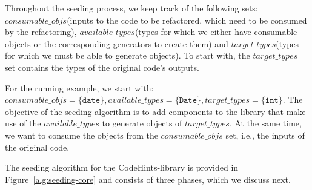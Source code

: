 \documentclass[conference]{IEEEtran}
\newcommand{\consumableobjs}{\mbox{$\mathit{consumable\_objs}$}\xspace}
\newcommand{\availabletypes}{\mbox{$\mathit{available\_types}$}\xspace}
\newcommand{\targettypes}{\mbox{$\mathit{target\_types}$}\xspace}
\begin{document}


Throughout the seeding process, we keep track of the following sets:
\consumableobjs (inputs to the code to be refactored, which need to be consumed by the refactoring),  
\availabletypes (types for which we either have consumable objects or the corresponding generators to create them) and 
\targettypes (types for which we must be able to generate objects). To start with, the \targettypes set
contains the types of the original code's outputs. %

For the running example, we start with:
  $\consumableobjs = \{\texttt{date}\},  
  \availabletypes = \{\texttt{Date}\},
  \targettypes    = \{\texttt{int}\}$.
%
%
%
The objective of the seeding algorithm is to
add components to the library that make use of the \availabletypes to generate objects
of \targettypes. At the same time, we want to consume the objects from the
\consumableobjs set, i.e., the inputs of the original code.

The seeding algorithm for the CodeHints-library is provided in Figure~\ref{alg:seeding-core} and consists of three phases, which we discuss next.
\end{document}
